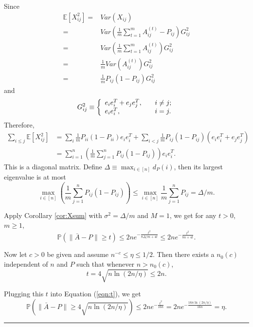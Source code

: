 \documentclass[a4paper]{article}
\newenvironment{proof}{{\bf Proof:  }}{\hfill\rule{2mm}{2mm}}
\begin{document}
\begin{proof}
Since
\begin{align*}
	\mathbb{E}[X_{ij}^2] = & Var(X_{ij}) \\
    = &	Var \left( \frac{1}{m} \sum_{t=1}^m A_{ij}^{(t)} - P_{ij} \right) G_{ij}^2 \\
    = &	Var \left( \frac{1}{m} \sum_{t=1}^m A_{ij}^{(t)} \right) G_{ij}^2 \\
    = & \frac{1}{m} Var(A_{ij}^{(t)}) G_{ij}^2 \\
    = & \frac{1}{m} P_{ij} (1-P_{ij}) G_{ij}^2
\end{align*}
and
\[
    G_{ij}^2 \equiv \left\{
    \begin{array}{l l}
        e_i e_i^T + e_j e_j^T, \quad & i \ne j;\\
        e_i e_i^T, \quad & i = j.
    \end{array}
    \right.
\]
Therefore,
\begin{align*}
	\sum_{i \le j} \mathbb{E}[X_{ij}^2] & = \sum_i \frac{1}{m} P_{ii} (1-P_{ii}) e_i e_i^T +
\sum_{i<j} \frac{1}{m} P_{ij} (1-P_{ij}) (e_i e_i^T + e_j e_j^T) \\
	& = \sum_{i=1}^n \left( \frac{1}{m} \sum_{j=1}^n P_{ij} (1-P_{ij}) \right) e_i e_i^T.
\end{align*}
This is a diagonal matrix. Define $\Delta \equiv \max_{i \in [n]} d_P(i)$, then its largest eigenvalue is at most
\[
	\max_{i \in [n]} \left( \frac{1}{m} \sum_{j=1}^n P_{ij} (1-P_{ij}) \right)
    \le \max_{i \in [n]} \frac{1}{m} \sum_{j=1}^n P_{ij} = \Delta/m.
\]

Apply Corollary \ref{cor:Xsum} with $\sigma^2 = \Delta/m$ and $M = 1$, we get for any $t>0$, $m \ge 1$,
\begin{equation}
\label{eqn:t}
	\mathbb{P}(\| \bar{A} - P \| \ge t) \le 2n e^{- \frac{t^2}{8 \Delta/m + 4t}}
    \le 2n e^{- \frac{t^2}{8n + 4t}}.
\end{equation}

Now let $c > 0$ be given and assume $n^{-c} \le \eta \le 1/2$. Then there exists a $n_0(c)$ independent of $n$ and $P$ such that whenever $n > n_0(c)$,
\[
	t = 4 \sqrt{n \ln(2n/\eta)} \le 2 n.
\]

Plugging this $t$ into Equation (\ref{eqn:t}), we get
\[
	\mathbb{P}(\| \bar{A} - P \| \ge 4 \sqrt{n \ln(2n/\eta)})
    \le 2n e^{-\frac{t^2}{16 n}} = 2n e^{-\frac{16 n \ln(2n/\eta)}{16 n}} = \eta.
\]
\end{proof}
\end{document}

